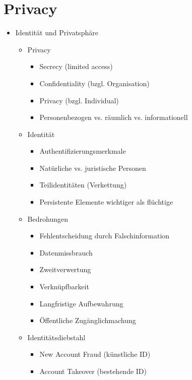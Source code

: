 \documentclass[11pt, paper=a4, twocolumn]{scrartcl}
\begin{document}
\section{Privacy}
	\begin{itemize}
		\item Identität und Privatsphäre
			\begin{itemize}
				\item Privacy
					\begin{itemize}
						\item Secrecy (limited access)
						\item Confidentiality (bzgl. Organisation)
						\item Privacy (bzgl. Individual)
						\item Personenbezogen vs. räumlich vs. 
							informationell
					\end{itemize}

				\item Identität
					\begin{itemize}
						\item Authentifizierungsmerkmale
						\item Natürliche vs. juristische Personen
						\item Teilidentitäten (Verkettung)
						\item Persistente Elemente wichtiger als 
							flüchtige
					\end{itemize}

				\item Bedrohungen
					\begin{itemize}
						\item Fehlentscheidung durch 
							Falschinformation
						\item Datenmissbrauch
						\item Zweitverwertung
						\item Verknüpfbarkeit
						\item Langfristige Aufbewahrung
						\item Öffentliche Zugänglichmachung
					\end{itemize}

				\item Identitätsdiebstahl
					\begin{itemize}
						\item New Account Fraud (künstliche ID)
						\item Account Takeover (bestehende ID)
					\end{itemize}
			\end{itemize}


\end{itemize}
\end{document}
